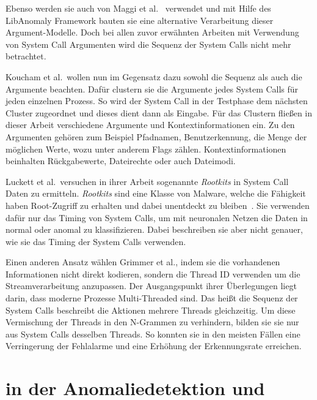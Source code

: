             Ebenso werden sie auch von Maggi et al.~\cite{MAGGI} verwendet und mit Hilfe des LibAnomaly Framework bauten sie eine alternative Verarbeitung dieser Argument-Modelle.
            Doch bei allen zuvor erwähnten Arbeiten mit Verwendung von System Call Argumenten wird die Sequenz der System Calls nicht mehr betrachtet.

            Koucham et al.\ wollen nun im Gegensatz dazu sowohl die Sequenz als auch die Argumente beachten.
            Dafür clustern sie die Argumente jedes System Calls für jeden einzelnen Prozess.
            So wird der System Call in der Testphase dem nächsten Cluster zugeordnet und dieses dient dann als Eingabe.
            Für das Clustern fließen in dieser Arbeit verschiedene Argumente und Kontextinformationen ein.
            Zu den Argumenten gehören zum Beispiel Pfadnamen, Benutzerkennung, die Menge der möglichen Werte, wozu unter anderem Flags zählen.
            Kontextinformationen beinhalten Rückgabewerte, Dateirechte oder auch Dateimodi.~\cite{ARGUMENTCLUSTERKOUCHAM2015}

            Luckett et al.\ versuchen in ihrer Arbeit sogenannte \textit{Rootkits} in System Call Daten zu ermitteln.
            \textit{Rootkits} sind eine Klasse von Malware, welche die Fähigkeit haben Root-Zugriff zu erhalten und dabei unentdeckt zu bleiben~\cite{OSSECBRAY2008}.
            Sie verwenden dafür nur das Timing von System Calls, um mit neuronalen Netzen die Daten in normal oder anomal zu klassifizieren.
            Dabei beschreiben sie aber nicht genauer, wie sie das Timing der System Calls verwenden.~\cite{TIMINGLUCKETT2016}

            Einen anderen Ansatz wählen Grimmer et al., indem sie die vorhandenen Informationen nicht direkt kodieren, sondern die Thread ID verwenden um die Streamverarbeitung anzupassen.
            Der Ausgangspunkt ihrer Überlegungen liegt darin, dass moderne Prozesse Multi-Threaded sind.
            Das heißt die Sequenz der System Calls beschreibt die Aktionen mehrere Threads gleichzeitig.
            Um diese Vermischung der Threads in den N-Grammen zu verhindern, bilden sie sie nur aus System Calls desselben Threads.
            So konnten sie in den meisten Fällen eine Verringerung der Fehlalarme und eine Erhöhung der Erkennungsrate erreichen.\cite{IDSTHREADGRIMMER2021}

    \section{ in der Anomalie\-detektion und }\label{sec:related_nlp}

